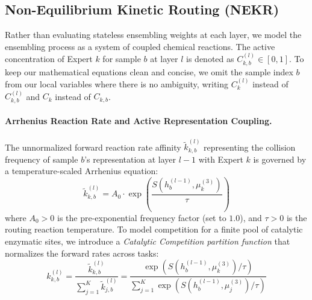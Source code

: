 \subsection{Non-Equilibrium Kinetic Routing (NEKR)}
\label{sec:nekr}
Rather than evaluating stateless ensembling weights at each layer, we model the ensembling process as a system of coupled chemical reactions. The active concentration of Expert $k$ for sample $b$ at layer $l$ is denoted as $C_{k,b}^{(l)} \in [0, 1]$. To keep our mathematical equations clean and concise, we omit the sample index $b$ from our local variables where there is no ambiguity, writing $C_k^{(l)}$ instead of $C_{k,b}^{(l)}$ and $C_k$ instead of $C_{k,b}$. 

\paragraph{Arrhenius Reaction Rate and Active Representation Coupling.} The unnormalized forward reaction rate affinity $\tilde{k}_{k,b}^{(l)}$ representing the collision frequency of sample $b$'s representation at layer $l-1$ with Expert $k$ is governed by a temperature-scaled Arrhenius equation:
\begin{equation}
\tilde{k}_{k, b}^{(l)} = A_0 \cdot \exp\left( \frac{S(h_b^{(l-1)}, \mu_k^{(3)})}{\tau} \right)
\end{equation}
where $A_0 > 0$ is the pre-exponential frequency factor (set to $1.0$), and $\tau > 0$ is the routing reaction temperature. To model competition for a finite pool of catalytic enzymatic sites, we introduce a \emph{Catalytic Competition partition function} that normalizes the forward rates across tasks:
\begin{equation}
k_{k,b}^{(l)} = \frac{\tilde{k}_{k,b}^{(l)}}{\sum_{j=1}^K \tilde{k}_{j,b}^{(l)}} = \frac{\exp\left( S(h_b^{(l-1)}, \mu_k^{(3)}) / \tau \right)}{\sum_{j=1}^K \exp\left( S(h_b^{(l-1)}, \mu_j^{(3)}) / \tau \right)}
\label{eq:arrhenius}
\end{equation}

